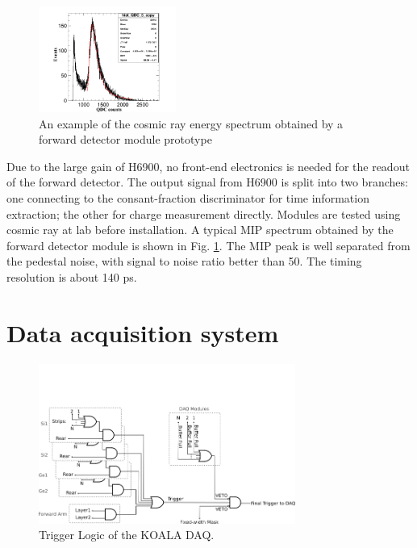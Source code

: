 \documentclass[number,5p]{elsarticle}
\begin{document}
\begin{figure}[htbp]
\centering
\includegraphics[width=0.4\textwidth]{./forward_mip.pdf}
\caption{An example of the cosmic ray energy spectrum obtained by a forward detector module prototype}
\label{fig:forward_mip}
\end{figure}

Due to the large gain of H6900, no front-end electronics is needed for the readout of the forward detector.
The output signal from H6900 is split into two branches: one connecting to the
consant-fraction discriminator for time information extraction; the other for charge measurement directly.
Modules are tested using cosmic ray at lab before installation.
A typical MIP spectrum obtained by the forward detector module is shown in Fig. \ref{fig:forward_mip}. 
The MIP peak is well separated from the pedestal noise, with signal to noise ratio better than 50.
The timing resolution is about 140 ps.

\section{Data acquisition system}
\label{sec:daq}

\begin{figure}[htbp]
\centering
\includegraphics[width=0.75\textwidth]{./trigger_logic.png}
\caption{Trigger Logic of the KOALA DAQ.}
\label{fig:trigger_logic}
\end{figure}
\end{document}
